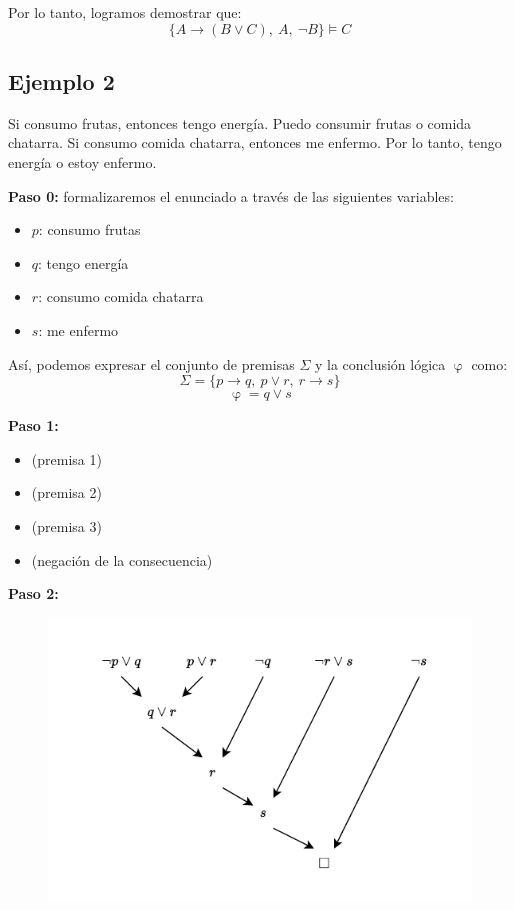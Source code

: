 \documentclass{article}
\begin{document}
Por lo tanto, logramos demostrar que:
$$\{A \rightarrow (B \vee C),\ A,\ \neg B\} \vDash C$$

\newpage

\subsection{Ejemplo 2}
Si consumo frutas, entonces tengo energía. Puedo consumir frutas o comida
chatarra. Si consumo comida chatarra, entonces me enfermo. Por lo tanto, tengo
energía o estoy enfermo.

\textbf{Paso 0:} formalizaremos el enunciado a través de las siguientes
variables:
\begin{itemize}
  \item $p$: consumo frutas
  \item $q$: tengo energía
  \item $r$: consumo comida chatarra
  \item $s$: me enfermo
\end{itemize}

Así, podemos expresar el conjunto de premisas $\Sigma$ y la conclusión lógica
$\upvarphi$ como:
$$\Sigma = \{p \rightarrow q,\ p \vee r,\ r \rightarrow s\}$$
$$\upvarphi = q \vee s$$

\textbf{Paso 1:}
\begin{itemize}
  \item{
        (premisa 1)}
  \item{ (premisa 2)}
  \item{
        (premisa 3)}
  \item{
        (negación de la consecuencia)}
\end{itemize}

\textbf{Paso 2:}
\begin{figure}[H]
  \centering
  \includegraphics[width=.6\textwidth]{images/resolucion_02.pdf}
\end{figure}
\end{document}
